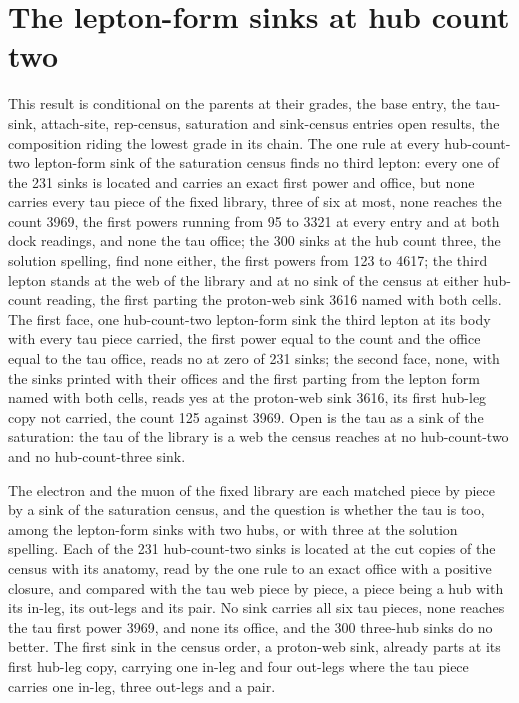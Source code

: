 \section{The lepton-form sinks at hub count two}\label{mod:VIII-1-D539808-w-lhc2}
\begin{chwall}\label{box:VIII-1-D539808-w-lhc2:1}
This result is conditional on the parents at their grades, the base entry, the tau-sink, attach-site, rep-census, saturation and sink-census entries open results, the composition riding the lowest grade in its chain. The one rule at every hub-count-two lepton-form sink of the saturation census finds no third lepton: every one of the 231 sinks is located and carries an exact first power and office, but none carries every tau piece of the fixed library, three of six at most, none reaches the count 3969, the first powers running from 95 to 3321 at every entry and at both dock readings, and none the tau office; the 300 sinks at the hub count three, the solution spelling, find none either, the first powers from 123 to 4617; the third lepton stands at the web of the library and at no sink of the census at either hub-count reading, the first parting the proton-web sink 3616 named with both cells.
The first face, one hub-count-two lepton-form sink the third lepton at its body with every tau piece carried, the first power equal to the count and the office equal to the tau office, reads no at zero of 231 sinks; the second face, none, with the sinks printed with their offices and the first parting from the lepton form named with both cells, reads yes at the proton-web sink 3616, its first hub-leg copy not carried, the count 125 against 3969. Open is the tau as a sink of the saturation: the tau of the library is a web the census reaches at no hub-count-two and no hub-count-three sink.
\end{chwall}
The electron and the muon of the fixed library are each matched piece by piece by a sink of the saturation census, and the question is whether the tau is too, among the lepton-form sinks with two hubs, or with three at the solution spelling. Each of the 231 hub-count-two sinks is located at the cut copies of the census with its anatomy, read by the one rule to an exact office with a positive closure, and compared with the tau web piece by piece, a piece being a hub with its in-leg, its out-legs and its pair. No sink carries all six tau pieces, none reaches the tau first power 3969, and none its office, and the 300 three-hub sinks do no better. The first sink in the census order, a proton-web sink, already parts at its first hub-leg copy, carrying one in-leg and four out-legs where the tau piece carries one in-leg, three out-legs and a pair.
